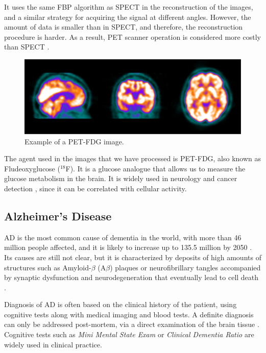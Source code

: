 It uses the same \ac{FBP} algorithm as \ac{SPECT} in the reconstruction of the images, and a similar strategy for acquiring the signal at different angles. However, the amount of data is smaller than in \ac{SPECT}, and therefore, the reconstruction procedure is harder. As a result, \ac{PET} scanner operation is considered more costly than \ac{SPECT} \cite{Carlson2016}.  

\begin{figure}[htp]
	\centering
	\includegraphics[width=0.7\linewidth]{Graphics/ch2/example_PET}
	\caption[Example of a PET-FDG image.]{Example of a PET-FDG image.}
	\label{fig:example_PET}
\end{figure}

The agent used in the images that we have processed is PET-FDG, also known as Fludeoxyglucose ($^{18}$F). It is a glucose analogue that allows us to measure the glucose metabolism in the brain. It is widely used in neurology \cite{Newberg2002} and cancer detection \cite{Kelloff2005}, since it can be correlated with cellular activity. 

\label{sec:disorders}
\subsection{Alzheimer's Disease}
\acf{AD} is the most common cause of dementia in the world, with more than 46 million people affected, and it is likely to increase up to 135.5 million by 2050 \cite{Association2016}. Its causes are still not clear, but it is characterized by deposits of high amounts of structures such as Amyloid-$\beta$ (A$\beta$) plaques or neurofibrillary tangles accompanied by synaptic dysfunction and neurodegeneration that eventually lead to cell death \cite{Ballard2011,Sevigny2016}.

Diagnosis of \ac{AD} is often based on the clinical history of the patient, using cognitive tests along with medical imaging and blood tests. A definite diagnosis can only be addressed post-mortem, via a direct examination of the brain tissue \cite{Ballard2011}. Cognitive tests such as \textit{Mini Mental State Exam} or \textit{Clinical Dementia Ratio} are widely used in clinical practice. 

